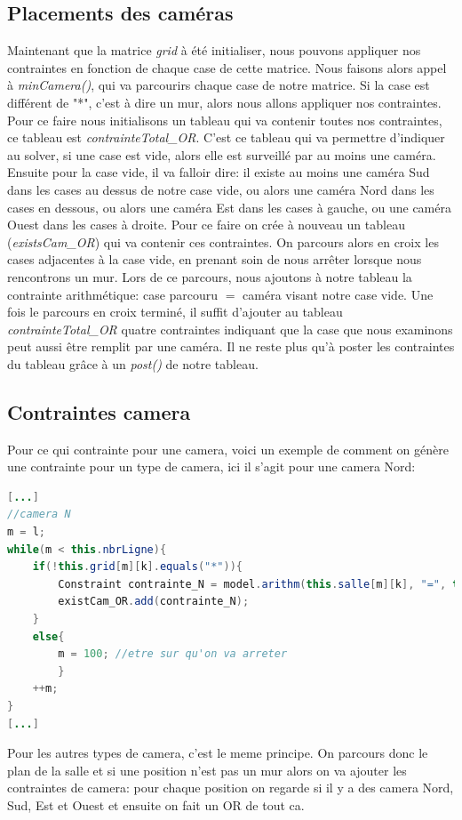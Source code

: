 \documentclass[a4paper,10pt]{article}
\begin{document}
\subsection{Placements des caméras}
Maintenant que la matrice \emph{grid} à été initialiser, nous pouvons appliquer nos contraintes en fonction de chaque case de cette matrice. Nous faisons alors appel à \emph{minCamera()}, qui va parcourirs chaque case de notre matrice.  Si la case est différent de "*", c'est à dire un mur, alors nous allons appliquer nos contraintes. Pour ce faire nous initialisons un tableau qui va contenir toutes nos contraintes, ce tableau est \emph{contrainteTotal\_OR}. C'est ce tableau qui va permettre d'indiquer au solver, si une case est vide, alors elle est surveillé par au moins une caméra. Ensuite pour la case vide, il va falloir dire: il existe au moins une caméra Sud dans les cases au dessus de notre case vide, ou alors une caméra Nord dans les cases en dessous, ou alors une caméra Est dans les cases à gauche, ou une caméra Ouest dans les cases à droite.  Pour ce faire on crée à nouveau un tableau (\emph{existsCam\_OR}) qui va contenir ces contraintes. On parcours alors en croix les cases adjacentes à la case vide, en prenant soin de nous arrêter lorsque nous rencontrons un mur. Lors de ce parcours, nous ajoutons à notre tableau la contrainte arithmétique: case parcouru $=$ caméra visant notre case vide. Une fois le parcours en croix terminé, il suffit d'ajouter au tableau \emph{contrainteTotal\_OR} quatre contraintes indiquant que la case que nous examinons peut aussi être remplit par une caméra. Il ne reste plus qu'à poster les contraintes du tableau grâce à un \emph{post()} de notre tableau.

\subsection{Contraintes camera}
Pour ce qui contrainte pour une camera, voici un exemple de comment on génère une contrainte pour un type de camera, ici il s'agit pour une camera Nord:
\begin{lstlisting}[language=Java,basicstyle=\tiny]
[...]
//camera N
m = l;
while(m < this.nbrLigne){
	if(!this.grid[m][k].equals("*")){
		Constraint contrainte_N = model.arithm(this.salle[m][k], "=", this.NORD);
		existCam_OR.add(contrainte_N);
	}
	else{
		m = 100; //etre sur qu'on va arreter
		}
	++m;
}
[...]
\end{lstlisting}
Pour les autres types de camera, c'est le meme principe. On parcours donc le plan de la salle et si une position n'est pas un mur alors on va ajouter les contraintes de camera: pour chaque position on regarde si il y a des camera Nord, Sud, Est et Ouest et ensuite on fait un OR de tout ca.
\end{document}
